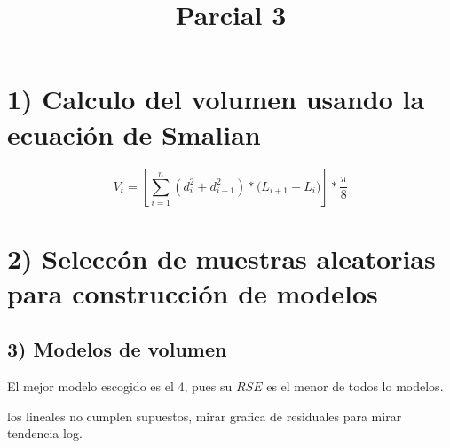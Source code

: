 \documentclass[9pt,onecolumn,twoside,]{pinp}
\title{Parcial 3}
\author[]{}
\begin{document}
\verticaladjustment{-2pt}

\maketitle
\thispagestyle{firststyle}



\hypertarget{calculo-del-volumen-usando-la-ecuaciuxf3n-de-smalian}{%
\section{1) Calculo del volumen usando la ecuación de
Smalian}\label{calculo-del-volumen-usando-la-ecuaciuxf3n-de-smalian}}

\[V_t= [\sum_{i=1}^{n}{(d_i^2+d_{i+1}^2)* (L_{i+1}-L_{i}})] * \frac{\pi}{8}\]

\hypertarget{seleccuxf3n-de-muestras-aleatorias-para-construcciuxf3n-de-modelos}{%
\section{2) Seleccón de muestras aleatorias para construcción de
modelos}\label{seleccuxf3n-de-muestras-aleatorias-para-construcciuxf3n-de-modelos}}

\hypertarget{modelos-de-volumen}{%
\subsection{3) Modelos de volumen}\label{modelos-de-volumen}}

El mejor modelo escogido es el 4, pues su \(RSE\) es el menor de todos
lo modelos.

los lineales no cumplen supuestos, mirar grafica de residuales para
mirar tendencia log.
\end{document}
